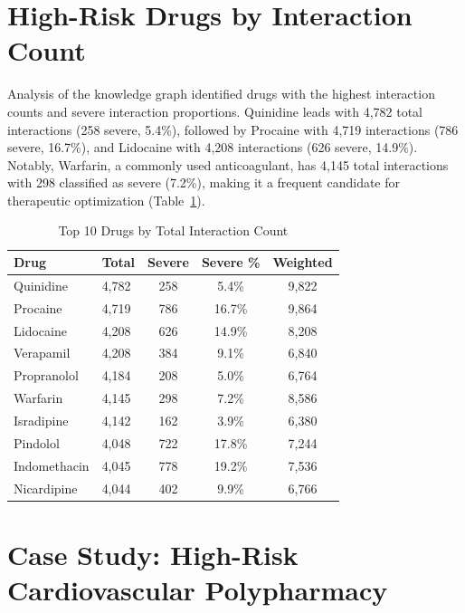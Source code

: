 \documentclass[11pt,a4paper]{article}
\begin{document}
\section{High-Risk Drugs by Interaction Count}

Analysis of the knowledge graph identified drugs with the highest interaction counts and severe interaction proportions. Quinidine leads with 4,782 total interactions (258 severe, 5.4\%), followed by Procaine with 4,719 interactions (786 severe, 16.7\%), and Lidocaine with 4,208 interactions (626 severe, 14.9\%). Notably, Warfarin, a commonly used anticoagulant, has 4,145 total interactions with 298 classified as severe (7.2\%), making it a frequent candidate for therapeutic optimization (Table~\ref{tab:high_risk_drugs}).

\begin{table}[H]
\centering
\caption{Top 10 Drugs by Total Interaction Count}
\label{tab:high_risk_drugs}
\begin{tabular}{llccc}
\toprule
\textbf{Drug} & \textbf{Total} & \textbf{Severe} & \textbf{Severe \%} & \textbf{Weighted} \\
\midrule
Quinidine & 4,782 & 258 & 5.4\% & 9,822 \\
Procaine & 4,719 & 786 & 16.7\% & 9,864 \\
Lidocaine & 4,208 & 626 & 14.9\% & 8,208 \\
Verapamil & 4,208 & 384 & 9.1\% & 6,840 \\
Propranolol & 4,184 & 208 & 5.0\% & 6,764 \\
Warfarin & 4,145 & 298 & 7.2\% & 8,586 \\
Isradipine & 4,142 & 162 & 3.9\% & 6,380 \\
Pindolol & 4,048 & 722 & 17.8\% & 7,244 \\
Indomethacin & 4,045 & 778 & 19.2\% & 7,536 \\
Nicardipine & 4,044 & 402 & 9.9\% & 6,766 \\
\bottomrule
\end{tabular}
\end{table}

\section{Case Study: High-Risk Cardiovascular Polypharmacy}
\end{document}
